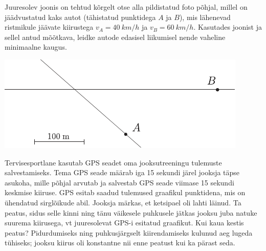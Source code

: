 \documentclass[10pt, twoside]{article}
\begin{document}
{%

Juuresolev joonis on tehtud kõrgelt otse alla pildistatud foto põhjal, millel on jäädvustatud kaks autot (tähistatud punktidega $A$ ja $B$), mis lähenevad ristmikule jäävate kiirustega $v_A = \SI{40}{km/h}$ ja $v_B = \SI{60}{km/h}$. Kasutades joonist ja sellel antud mõõtkava, leidke autode edasisel liikumisel nende vaheline minimaalne kaugus.

\begin{center}
	\includegraphics[width=0.9\linewidth]{2008-v2g-02-yl}
\end{center}
\probend
\bigskip


Tervisesportlane kasutab GPS seadet oma jooksutreeningu tulemuste salvestamiseks.
Tema GPS seade määrab iga 15 sekundi järel jooksja täpse asukoha, mille põhjal arvutab ja salvestab GPS seade viimase 15 sekundi keskmise kiiruse.
GPS esitab saadud tulemused graafikul punktidena, mis on ühendatud sirglõikude abil.
Jooksja märkas, et ketsipael oli lahti läinud.
Ta peatus, sidus selle kinni ning tänu väikesele puhkusele jätkas jooksu juba natuke suurema
kiirusega, vt juuresolevat GPS-i esitatud graafikut. Kui kaua kestis peatus? Pidurdumiseks ning puhkusjärgselt kiirendamiseks kulunud
aeg lugeda tühiseks; jooksu kiirus oli konstantne nii enne peatust kui ka pärast seda.

}
\end{document}
